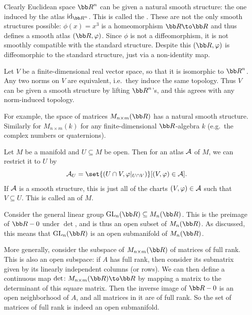     Clearly Euclidean space $\bR^n$ can be given a natural smooth structure: the one induced by the atlas $\id_{\bR^n}$.
    This is called the .
    These are not the only smooth structures possible: $\phi(x)=x^3$ is a homeomorphism $\bR\to\bR$ and thus defines a smooth atlas
    $(\bR,\phi)$.
    Since $\phi$ is not a diffeomorphism, it is not smoothly compatible with the standard structure.
    Despite this $(\bR,\phi)$ is diffeomorphic to the standard structure, just via a non-identity map.

\eexam

\bexam

    Let $V$ be a finite-dimensional real vector space, so that it is isomorphic to $\bR^n$.
    Any two norms on $V$ are equivalent, i.e.\ they induce the same topology.
    Thus $V$ can be given a smooth structure by lifting $\bR^n$'s, and this agrees with any norm-induced topology.

    For example, the space of matrices $M_{n\times m}(\bR)$ has a natural smooth structure.
    Similarly for $M_{n\times m}(k)$ for any finite-dimensional $\bR$-algebra $k$ (e.g.\ the complex numbers or quaternions).

\eexam

\bexam

    Let $M$ be a manifold and $U\subseteq M$ be open.
    Then for an atlas ${{\cal A}}$ of $M$, we can restrict it to $U$ by
    $$ \A_U = \set{(U\cap V,\phi|_{U\cap V})}[(V,\phi)\in\A] . $$
    If ${{\cal A}}$ is a smooth structure, this is just all of the charts $(V,\varphi)\in{{\cal A}}$ such that $V\subseteq U$.
    This is called an  of $M$.

\eexam

\bexam

    Consider the general linear group $\gl_n(\bR)\subseteq M_n(\bR)$.
    This is the preimage of $\bR-0$ under $\det$, and is thus an open subset of $M_n(\bR)$.
    As discussed, this means that $\gl_n(\bR)$ is an open submanifold of $M_n(\bR)$.

    More generally, consider the subspace of $M_{n\times m}(\bR)$ of matrices of full rank.
    This is also an open subspace: if $A$ has full rank, then consider its submatrix given by its linearly independent columns (or rows).
    We can then define a continuous map $\det\colon M_{n\times m}(\bR)\to\bR$ by mapping a matrix to the determinant of this square matrix.
    Then the inverse image of $\bR-0$ is an open neighborhood of $A$, and all matrices in it are of full rank.
    So the set of matrices of full rank is indeed an open submanifold.

